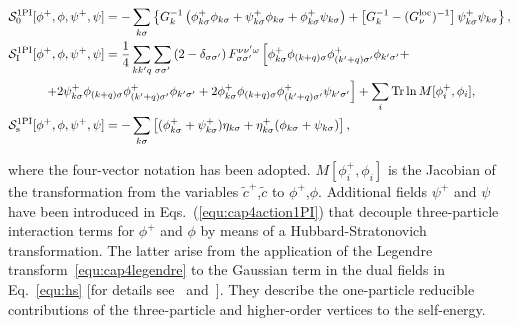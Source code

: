 \documentclass[rmp,aps,reprint,amsmath,amssymb,superscriptaddress,showpacs,nofootinbib]{revtex4-1}
\begin{document}
\begin{widetext}
\begin{subequations}
\label{equ:cap4action1PI} 
\begin{align}
 \label{equ:cap4action1PIbare}
 &\mathcal{S}^{\text{1PI}}_0[\phi^+,\phi,\psi^+,\psi]=-\sum_{k\sigma}\left\{G^{-1}_k\left(\phi_{k\sigma}^+\phi_{k\sigma}+\psi_{k\sigma}^+\phi_{k\sigma}+\phi_{k\sigma}^+\psi_{k\sigma}\right)+\left[G^{-1}_k-(G^{\text{loc}}_{\nu})^{-1}\right]\psi_{k\sigma}^+\psi_{k\sigma}\right\},\\
 &\mathcal{S}^{\text{1PI}}_{\text{I}}[\phi^+,\phi,\psi^+,\psi]=\frac{1}{4}\sum_{kk'q}\sum_{\sigma\sigma'}\left(2-\delta_{\sigma\sigma'}\right)F_{\sigma\sigma'}^{\nu\nu'\omega}\left[\phi^+_{k\sigma}\phi_{(k+q)\sigma}\phi^+_{(k'+q)\sigma'}\phi_{k'\sigma'}+\right.\nonumber\\ &\hspace{1.0cm}\left.+2\psi^+_{k\sigma}\phi_{(k+q)\sigma}\phi^+_{(k'+q)\sigma'}\phi_{k'\sigma'}+2\phi^+_{k\sigma}\phi_{(k+q)\sigma}\phi^+_{(k'+q)\sigma'}\psi_{k'\sigma'}\right]+\sum_i
 {\mathrm{Tr}}\ln M[\phi^+_i,\phi_i],\label{equ:cap4action1PIint}\\
 &\mathcal{S}^{\text{1PI}}_{\text{s}}[\phi^+,\phi,\psi^+,\psi]=-\sum_{k\sigma}\left[(\phi_{k\sigma}^+ + \psi^{+}_{k\sigma})\eta_{k\sigma}+\eta^{+}_{k\sigma}(\phi_{k\sigma}+\psi_{k\sigma})\right],
 \end{align}
 \end{subequations}
 \end{widetext}
where the four-vector notation has been adopted. $M[\phi^+_i,\phi_i]$ is the Jacobian of the transformation from the variables $\widetilde{c}^+$,$\widetilde{c}$ to $\phi^+$,$\phi$. Additional fields $\psi^+$ and $\psi$ have been introduced  in Eqs.~(\ref{equ:cap4action1PI}) that decouple three-particle interaction terms for $\phi^+$ and $\phi$ by means of a Hubbard-Stratonovich transformation. The latter arise from the application of the Legendre transform~\eqref{equ:cap4legendre} to the Gaussian term in the dual fields in Eq.~\eqref{equ:hs} [for details see~ and~]. They describe the one-particle reducible contributions of the three-particle and higher-order vertices to the self-energy.
\end{document}

